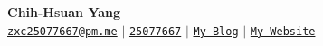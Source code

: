 \documentclass[letterpaper,11pt]{article}
\makeatletter
\newcommand{\myuline}[1]{%
  \uline{\phantom{#1}}%
  \llap{\contour{white}{#1}}%
}
\newcommand{\resumeItem}[1]{
  \item\small{
    {#1 \vspace{-1pt}}
  }
}
\newcommand{\resumeSubheading}[4]{
  \vspace{-1pt}\item
    \begin{tabular*}{\textwidth}[t]{l@{\extracolsep{\fill}}r}
      \textbf{#1} & {\color{dark-grey}\small #2}\vspace{1pt}\\ %
      \textit{#3} & {\color{dark-grey} \small #4}\\ %
    \end{tabular*}\vspace{-4pt}
}
\newcommand{\resumeSubHeadingListStart}{\begin{itemize}[leftmargin=0in, label={}]}
\newcommand{\resumeItemListStart}{\begin{itemize}}
\newcommand{\resumeItemListEnd}{\end{itemize}\vspace{0pt}}
\makeatother
\begin{document}
\begin{center}
    \textbf{\Huge Chih-Hsuan Yang} \\ \vspace{5pt}
    \small \faEnvelope \hspace{2pt} \texttt{\href{mailto:zxc25077667@pm.me}{zxc25077667@pm.me}} \hspace{1pt} $|$
    \hspace{1pt} \faGithub \hspace{2pt} \texttt{\href{https://github.com/25077667}{25077667}} \hspace{1pt} $|$
    \hspace{1pt} \faBlog \hspace{2pt}\texttt{\href{https://hackmd.io/@25077667/blog}{My Blog}} \hspace{1pt} $|$
    \hspace{1pt} \faCloud \hspace{2pt}\texttt{\href{https://scc-net.tw}{My Website}}
    \\ \vspace{-3pt}
\end{center}



\end{document}
